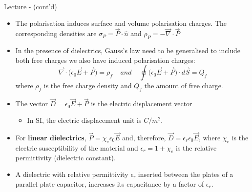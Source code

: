 %
%
%

\begin{frame}{Lecture \summarizedlecture - \lecturesummarytitle (cont'd)}

\begin{itemize}

   \item  The polarisation induces surface and volume polarisation charges.
          The corresponding densities are
          $\sigma_P = \vec{P} \cdot \hat{n}$ and $\rho_P = - \vec{\nabla} \cdot \vec{P}$

          \vspace{0.1cm}

    \item In the presence of dielectrics,  Gauss's law need to be generalised
          to include both free charges we also have induced polarisation charges:
          \begin{equation*}
             \vec{\nabla} \cdot \Big( \epsilon_0 \vec{E} + \vec{P} \Big) = \rho_f
              \;\;\;\; and \;\;\;\;
              \oint  \Big( \epsilon_0 \vec{E} + \vec{P} \Big) \cdot d\vec{S} = Q_f
          \end{equation*}
          where $\rho_f$ is the free charge density and $Q_f$ the amount of free charge.

          \vspace{0.1cm}

    \item The vector
           $\vec{D} = \epsilon_0 \vec{E} + \vec{P}$ is the electric displacement vector
          \begin{itemize}
             \item In SI, the electric displacement unit is $C/m^2$.
          \end{itemize}

          \vspace{0.1cm}

    \item For {\bf linear dielectrics},
              $\vec{P} = \chi_{e} \epsilon_0 \vec{E}$ and, therefore,
              $\vec{D} = \epsilon_r \epsilon_0 \vec{E}$,
              where
              $\chi_{e}$ is the electric susceptibility of the material and
              $\epsilon_r = 1 + \chi_e$ is the relative permittivity (dielectric constant).

 \item A dielectric with relative permittivity $\epsilon_r$ inserted
         between the plates of a parallel plate capacitor, increases
         its capacitance by a factor of $\epsilon_r$.

\end{itemize}

\end{frame}


